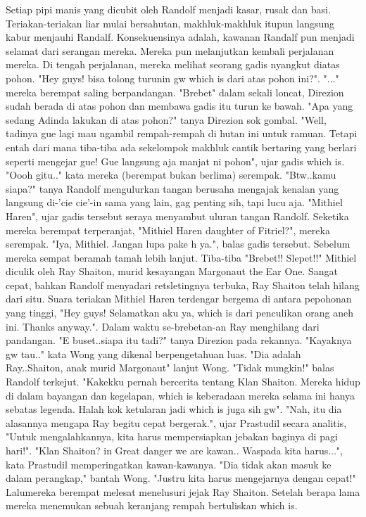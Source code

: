 \documentclass[a4paper,11pt,final]{article}
\begin{document}
Setiap pipi manis yang dicubit oleh Randolf menjadi kasar, rusak dan basi.
Teriakan-teriakan liar mulai bersahutan, makhluk-makhluk itupun langsung kabur menjauhi Randalf. Konsekuensinya adalah, kawanan Randalf pun menjadi selamat dari serangan mereka. Mereka pun melanjutkan kembali perjalanan mereka.
Di tengah perjalanan, mereka melihat seorang gadis nyangkut diatas pohon. "Hey guys! bisa tolong turunin gw which is dari atas pohon ini?".
"..." mereka berempat saling berpandangan. "Brebet" dalam sekali loncat, Direzion sudah berada di atas pohon dan membawa gadis itu turun ke bawah. "Apa yang sedang Adinda lakukan di atas pohon?" tanya Direzion sok gombal.
"Well, tadinya gue lagi mau ngambil rempah-rempah di hutan ini untuk ramuan. Tetapi entah dari mana tiba-tiba ada sekelompok makhluk cantik bertaring yang berlari seperti mengejar gue! Gue langsung aja manjat ni pohon", ujar gadis which is.
"Oooh gitu.." kata mereka (berempat bukan berlima) serempak. "Btw..kamu siapa?" tanya Randolf mengulurkan tangan berusaha mengajak kenalan yang langsung di-'cie cie'-in sama yang lain, gag penting sih, tapi lucu aja.
"Mithiel Haren", ujar gadis tersebut seraya menyambut uluran tangan Randolf. Seketika mereka berempat terperanjat, "Mithiel Haren daughter of Fitriel?", mereka serempak. "Iya, Mithiel. Jangan lupa pake h ya.", balas gadis tersebut.
Sebelum mereka sempat beramah tamah lebih lanjut. Tiba-tiba "Brebet!! Slepet!!" Mithiel diculik oleh Ray Shaiton, murid kesayangan Margonaut the Ear One. Sangat cepat, bahkan Randolf menyadari retsletingnya terbuka, Ray Shaiton telah hilang dari situ.
Suara teriakan Mithiel Haren terdengar bergema di antara pepohonan yang tinggi, "Hey guys! Selamatkan aku ya, which is dari penculikan orang aneh ini. Thanks anyway.".
Dalam waktu se-brebetan-an Ray menghilang dari pandangan. "E buset..siapa itu tadi?" tanya Direzion pada rekannya. "Kayaknya gw tau.." kata Wong yang dikenal berpengetahuan luas. "Dia adalah Ray..Shaiton, anak murid Margonaut" lanjut Wong.
"Tidak mungkin!" balas Randolf terkejut. "Kakekku pernah bercerita tentang Klan Shaiton. Mereka hidup di dalam bayangan dan kegelapan, which is keberadaan mereka selama ini hanya sebatas legenda. Halah kok ketularan jadi which is juga sih gw".
"Nah, itu dia alasannya mengapa Ray begitu cepat bergerak.", ujar Prastudil secara analitis, "Untuk mengalahkannya, kita harus mempersiapkan jebakan baginya di pagi hari!".
"Klan Shaiton? in Great danger we are kawan.. Waspada kita harus...", kata Prastudil memperingatkan kawan-kawanya.
"Dia tidak akan masuk ke dalam perangkap," bantah Wong. "Justru kita harus mengejarnya dengan cepat!" Lalumereka berempat melesat menelusuri jejak Ray Shaiton. Setelah berapa lama mereka menemukan sebuah keranjang rempah bertuliskan which is.
\end{document}
